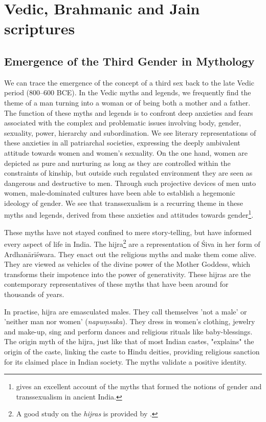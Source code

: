 \section{Vedic, Brahmanic and Jain scriptures}

\subsection{Emergence of the Third Gender in Mythology}
We can trace the emergence of the concept of a third sex back to the late Vedic period (800–600 BCE). In the Vedic myths and legends, we frequently find the theme of a man turning into a woman or of being both a mother and a father. The function of these myths and legends is to confront deep anxieties and fears associated with the complex and problematic issues involving body, gender, sexuality, power, hierarchy and subordination. We see literary representations of these anxieties in all patriarchal societies, expressing the deeply ambivalent attitude towards women and women's sexuality. On the one hand, women are depicted as pure and nurturing as long as they are controlled within the constraints of kinship, but outside such regulated environment they are seen as dangerous and destructive to men. Through such projective devices of men unto women, male-dominated cultures have been able to establish a hegemonic ideology of gender. We see that transsexualism is a recurring theme in these myths and legends, derived from these anxieties and attitudes towards gender\footnote{\cite{goldman} gives an excellent account of the myths that formed the notions of gender and transsexualism in ancient India.}.

These myths have not stayed confined to mere story-telling, but have informed every aspect of life in India. The hijra\footnote{A good study on the {\em hijras} is provided by \cite{nanda}.} are a representation of Śiva in her form of Ardhanārīśwara. They enact out the religious myths and make them come alive. They are viewed as vehicles of the divine power of the Mother Goddess, which transforms their impotence into the power of generativity. These hijras are the contemporary representatives of these myths that have been around for thousands of years.

In practise, hijra are emasculated males. They call themselves 'not a male' or 'neither man nor women' ({\em napuṃsaka}). They dress in women's clothing, jewelry and make-up, sing and perform dances and religious rituals like baby-blessings. The origin myth of the hijra, just like that of most Indian castes, "explains" the origin of the caste, linking the caste to Hindu deities, providing religious sanction for its claimed place in Indian society. The myths validate a positive identity.

